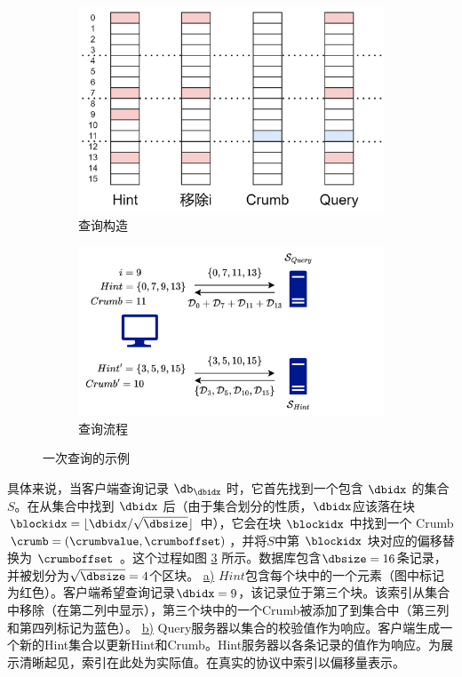 \begin{figure}
    \begin{subfigure}{0.5\textwidth}
        \centering
        \includegraphics[width=0.8\linewidth]{figure/sketch1.png}
        \caption{查询构造} \label{fig:query-a}
    \end{subfigure}%
    \hspace*{\fill}   %
    \begin{subfigure}{0.5\textwidth}
        \centering
        \includegraphics[width=0.8\linewidth]{figure/sketch2.png}
        \caption{查询流程} \label{fig:query-b}
    \end{subfigure}%
    \caption{一次查询的示例}
    \label{fig:query}
\end{figure}

具体来说，当客户端查询记录 $\db_\dbidx$ 时，它首先找到一个包含 $\dbidx$ 的集合 $S$。在从集合中找到 $\dbidx$ 后（由于集合划分的性质，$\dbidx$应该落在块 $\blockidx = \lfloor \dbidx/\sqrt{\dbsize} \rfloor$ 中），它会在块 $\blockidx$ 中找到一个 Crumb $\crumb=(\crumbvalue, \crumboffset)$，并将$S$中第 $\blockidx$ 块对应的偏移替换为 $\crumboffset$ 。这个过程如图 \ref{fig:query} 所示。数据库包含$\dbsize=16$条记录，并被划分为$\sqrt{\dbsize}=4$个区块。 \hyperref[fig:query-a]{a)} $Hint$包含每个块中的一个元素（图中标记为红色）。客户端希望查询记录$\dbidx=9$，该记录位于第三个块。该索引从集合中移除（在第二列中显示），第三个块中的一个Crumb被添加了到集合中（第三列和第四列标记为蓝色）。 \hyperref[fig:query-b]{b)} Query服务器以集合的校验值作为响应。客户端生成一个新的Hint集合以更新Hint和Crumb。Hint服务器以各条记录的值作为响应。为展示清晰起见，索引在此处为实际值。在真实的协议中索引以偏移量表示。

